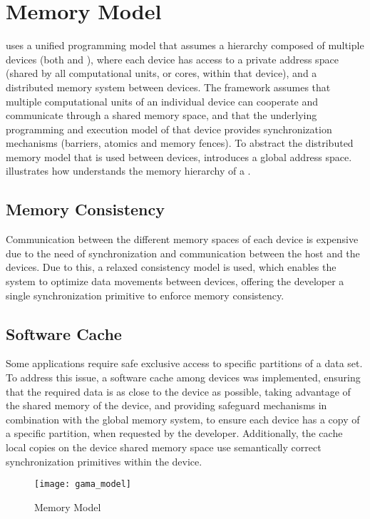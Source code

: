 \documentclass[main.tex]{subfiles}
\begin{document}
\section{Memory Model}

\gama uses a unified programming model that assumes a hierarchy composed of multiple devices (both \cpus and \gpus), where each device has access to a private address space (shared by all computational units, or cores, within that device), and a distributed memory system between devices. The framework assumes that multiple computational units of an individual device can cooperate and communicate through a shared memory space, and that the underlying programming and execution model of that device provides synchronization mechanisms (barriers, atomics and memory fences).
To abstract the distributed memory model that is used between devices, \gama introduces a global address space.  illustrates how \gama understands the memory hierarchy of a \hetplat.


\subsection{Memory Consistency}

Communication between the different memory spaces of each device is expensive due to the need of synchronization and communication between the host \cpu and the devices. Due to this, a relaxed consistency model is used, which enables the system to optimize data movements between devices, offering the developer a single synchronization primitive to enforce memory consistency.

\subsection{Software Cache}

Some applications require safe exclusive access to specific partitions of a data set. To address this issue, a software cache among devices was implemented, ensuring that the required data is as close to the device as possible, taking advantage of the shared memory of the device, and providing safeguard mechanisms in combination with the global memory system, to ensure each device has a copy of a specific partition, when requested by the developer. Additionally, the cache local copies on the device shared memory space use semantically correct synchronization primitives within the device.

\begin{figure}[!htp]
  \centering
  \texttt{[image: gama\_model]}
  \caption{\gama Memory Model \label{fig:gama_memory_model}}
\end{figure}
\end{document}
